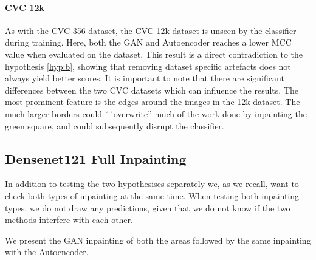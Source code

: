 \paragraph{CVC 12k}
As with the CVC 356 dataset, the CVC 12k dataset is unseen by the classifier during training. 
Here, both the GAN and Autoencoder reaches a lower MCC value when evaluated on the dataset. 
This result is a direct contradiction to the hypothesis \ref{hyp:b}, showing that removing dataset specific artefacts does not always yield better scores. 
It is important to note that there are significant differences between the two CVC datasets which can influence the results. The most prominent feature is the edges around the images in the 12k dataset. The much larger borders could  ´´overwrite'' much of the work done by inpainting the green square, and could subsequently disrupt the classifier.














































\subsection{Densenet121 Full Inpainting}

In addition to testing the two hypothesises separately we, as we recall, want to check both types of inpainting at the same time.
When testing both inpainting types, we do not draw any predictions, given that we do not know if the two methods interfere with each other. 

We present the GAN inpainting of both the areas followed by the same inpainting with the Autoencoder.


